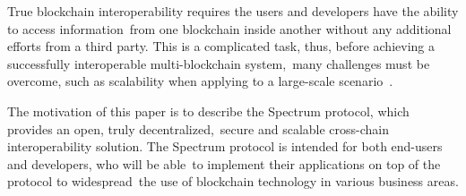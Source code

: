 True blockchain interoperability requires the users and developers have the ability to access information\
from one blockchain inside another without any additional efforts from a third party.
This is a complicated task, thus, before achieving a successfully interoperable multi-blockchain system,\
many challenges must be overcome, such as scalability when applying to a large-scale scenario~\cite{Kim2018}.

The motivation of this paper is to describe the Spectrum protocol, which provides an open, truly decentralized,\
secure and scalable cross-chain interoperability solution.
The Spectrum protocol is intended for both end-users and developers, who will be able\
to implement their applications on top of the protocol to widespread\
the use of blockchain technology in various business areas.
